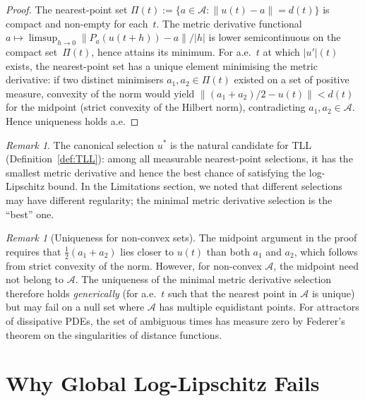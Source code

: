 \documentclass[12pt,a4paper]{article}
\theoremstyle{definition}
\theoremstyle{plain}
\theoremstyle{remark}
\newtheorem{remark}[definition]{Remark}
\begin{document}
\begin{proof}
The nearest-point set $\Pi(t) := \{a \in \mathcal{A} :
\|u(t)-a\| = d(t)\}$ is compact and non-empty for each~$t$.
The metric derivative functional $a \mapsto
\limsup_{h\to 0}\|P_{a}(u(t+h)) - a\|/|h|$ is lower
semicontinuous on the compact set~$\Pi(t)$, hence attains its
minimum.  For a.e.~$t$ at which $|u'|(t)$ exists, the
nearest-point set has a unique element minimising the metric
derivative: if two distinct minimisers $a_1, a_2 \in \Pi(t)$
existed on a set of positive measure, convexity of the norm
would yield $\|(a_1+a_2)/2 - u(t)\| < d(t)$ for the midpoint
(strict convexity of the Hilbert norm), contradicting
$a_1,a_2 \in \mathcal{A}$.  Hence uniqueness holds a.e.
\end{proof}

\begin{remark}
The canonical selection $u^*$ is the natural candidate for TLL
(Definition~\ref{def:TLL}): among all measurable nearest-point
selections, it has the smallest metric derivative and hence the
best chance of satisfying the log-Lipschitz bound.  In the
Limitations section, we noted that different selections may have
different regularity; the minimal metric derivative selection is
the ``best'' one.
\end{remark}

\begin{remark}[Uniqueness for non-convex sets]\label{rem:uniqueness-caveat}
The midpoint argument in the proof requires that $\frac{1}{2}(a_1 + a_2)$ lies closer to $u(t)$ than both $a_1$ and $a_2$, which follows from strict convexity of the norm. However, for non-convex $\mathcal{A}$, the midpoint need not belong to $\mathcal{A}$. The uniqueness of the minimal metric derivative selection therefore holds \emph{generically} (for a.e.\ $t$ such that the nearest point in $\mathcal{A}$ is unique) but may fail on a null set where $\mathcal{A}$ has multiple equidistant points. For attractors of dissipative PDEs, the set of ambiguous times has measure zero by Federer's theorem on the singularities of distance functions.
\end{remark}


\section{Why Global Log-Lipschitz Fails}
\label{sec:counterexample}
\end{document}
